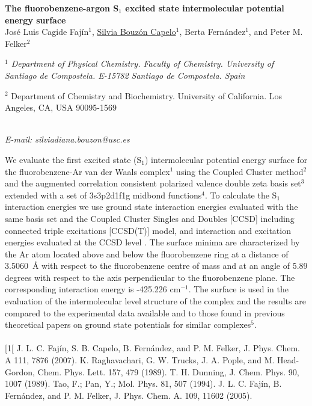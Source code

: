 \begin{center}
{\bf \Large
The fluorobenzene-argon S$_{1}$ excited state intermolecular potential energy surface
}
\\
\vspace{0.5cm}
José Luis Cagide Fajín$^{1}$,  \underline{Silvia Bouzón Capelo}$^{1}$,  Berta Fernández$^{1}$, and Peter M. Felker$^{2}$
\\
\vspace{0.5cm}
{\it 
$^{1}$ Department of Physical Chemistry. Faculty of Chemistry. University of Santiago de Compostela. E-15782 Santiago de Compostela. Spain

$^{2}$ Department of Chemistry and Biochemistry. University of California. Los Angeles, CA, USA 90095-1569
}
\\
\vspace{0.5cm}
{\it E-mail: silviadiana.bouzon@usc.es}
\\
\vspace{0.5cm}
\end{center}
We evaluate the first excited state (S$_{1}$) intermolecular potential energy surface for the fluorobenzene-Ar van der Waals complex$^{1}$ using the Coupled Cluster method$^{2}$ and the augmented correlation consistent polarized valence double zeta basis set$^{3}$ extended with a set of 3s3p2d1f1g midbond functions$^{4}$. To calculate the S$_{1}$ interaction energies we use ground state interaction energies evaluated with the same basis set and the Coupled Cluster Singles and Doubles [CCSD] including connected triple excitations [CCSD(T)] model, and interaction and excitation energies evaluated at the CCSD level . The surface minima are characterized by the Ar atom located above and below the fluorobenzene ring at a distance of 3.5060~{\AA} with respect to the fluorobenzene centre of mass and at an angle of 5.89 degrees with respect to the axis perpendicular to the fluorobenzene plane. The corresponding interaction energy is -425.226 cm$^{-1}$. The surface is used in the evaluation of the intermolecular level structure of the complex and the results are compared to the experimental data available and to those found in previous theoretical papers on ground state potentials for similar complexes$^{5}$.
\\
\vspace{0.5cm}
\\
{\footnotesize
[1[ J. L. C. Fajín, S. B. Capelo, B. Fernández, and P. M. Felker, J. Phys. Chem. A 111, 7876 (2007).
\newline
[2] K. Raghavachari, G. W. Trucks, J. A. Pople, and M. Head-Gordon, Chem. Phys. Lett. 157, 479 (1989).
\newline
[3] T. H. Dunning, J. Chem. Phys. 90, 1007 (1989).
\newline
[4] Tao, F.; Pan, Y.; Mol. Phys. 81, 507 (1994).
\newline
[5] J. L. C. Fajín, B. Fernández, and P. M. Felker, J. Phys. Chem. A. 109, 11602 (2005).
}

